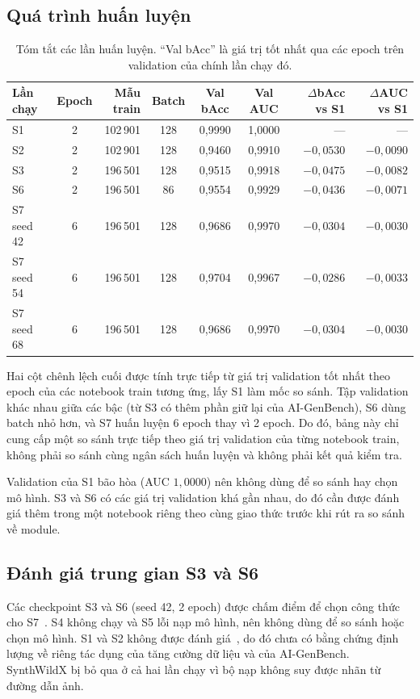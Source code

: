 \documentclass[11pt,a4paper]{article}
\begin{document}
\subsection{Quá trình huấn luyện}
\begin{table}[htbp]\centering\small
\caption{Tóm tắt các lần huấn luyện. ``Val bAcc'' là giá trị tốt nhất qua các epoch trên validation của chính lần chạy đó.}\label{tab:train}
\begin{tabular}{lcrcccrr}
\toprule
Lần chạy & Epoch & Mẫu train & Batch & Val bAcc & Val AUC & $\Delta$bAcc vs S1 & $\Delta$AUC vs S1 \\
\midrule
S1 & 2 & 102\,901 & 128 & 0,9990 & 1,0000 & --- & --- \\
S2 & 2 & 102\,901 & 128 & 0,9460 & 0,9910 & $-0,0530$ & $-0,0090$ \\
S3 & 2 & 196\,501 & 128 & 0,9515 & 0,9918 & $-0,0475$ & $-0,0082$ \\
S6 & 2 & 196\,501 & 86 & 0,9554 & 0,9929 & $-0,0436$ & $-0,0071$ \\
S7 seed 42 & 6 & 196\,501 & 128 & 0,9686 & 0,9970 & $-0,0304$ & $-0,0030$ \\
S7 seed 54 & 6 & 196\,501 & 128 & 0,9704 & 0,9967 & $-0,0286$ & $-0,0033$ \\
S7 seed 68 & 6 & 196\,501 & 128 & 0,9686 & 0,9970 & $-0,0304$ & $-0,0030$ \\
\bottomrule
\end{tabular}
\end{table}
Hai cột chênh lệch cuối được tính trực tiếp từ giá trị validation tốt nhất theo epoch của các notebook train tương ứng, lấy S1 làm mốc so sánh. Tập validation khác nhau giữa các bậc (từ S3 có thêm phần giữ lại của AI-GenBench), S6 dùng batch nhỏ hơn, và S7 huấn luyện 6 epoch thay vì 2 epoch. Do đó, bảng này chỉ cung cấp một so sánh trực tiếp theo giá trị validation của từng notebook train, không phải so sánh cùng ngân sách huấn luyện và không phải kết quả kiểm tra.

Validation của S1 bão hòa (AUC $1{,}0000$) nên không dùng để so sánh hay chọn mô hình. S3 và S6 có các giá trị validation khá gần nhau, do đó cần được đánh giá thêm trong một notebook riêng theo cùng giao thức trước khi rút ra so sánh về module.

\subsection{Đánh giá trung gian S3 và S6}\label{sec:interim}
Các checkpoint S3 và S6 (seed 42, 2 epoch) được chấm điểm để chọn công thức cho S7~\cite{baopv051_2025_xla_eval_s3_6}. S4 không chạy và S5 lỗi nạp mô hình, nên không dùng để so sánh hoặc chọn mô hình. S1 và S2 không được đánh giá~\cite{baopv051_2025_xla_training_s1,baopv051_2025_xla_training_s2}, do đó chưa có bằng chứng định lượng về riêng tác dụng của tăng cường dữ liệu và của AI-GenBench. SynthWildX bị bỏ qua ở cả hai lần chạy vì bộ nạp không suy được nhãn từ đường dẫn ảnh.
\end{document}
